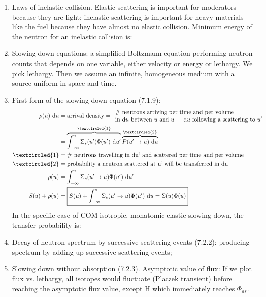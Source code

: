 \documentclass{school-22.211-notes}
\begin{document}
\begin{enumerate}
\item Laws of inelastic collision. Elastic scattering is important for moderators because they are light; inelastic scattering is important for heavy materials like the fuel because they have almost no elastic collision. Minimum energy of the neutron for an inelastic collision is:

\item Slowing down equations: a simplified Boltzmann equation performing neutron counts that depends on one variable, either velocity or energy or lethargy. We pick lethargy. Then we assume an infinite, homogeneous medium with a source uniform in space and time. 

\item First form of the slowing down equation (7.1.9):
  \begin{align}
    \rho(u) \du 
    &= \mbox{arrival density} = \begin{array}{l}
      \mbox{\# neutrons arriving per time and per volume} \\
      \mbox{in d$u$ between $u$ and $u + \du$ following a scattering to $u'$} 
      \end{array} \\
    &= \overbrace{\int_{-\infty}^u \Sigma_s (u') \Phi(u') \du'}^{\textcircled{1}} \overbrace{ P(u'\to u) \du }^{\textcircled{2}} \\
    \textcircled{1} &= \mbox{\# neutrons travelling in du' and scattered per time and per volume} \\
    \textcircled{2} &= \mbox{probability a neutron scattered at u' will be transferred in du} \\
    \rho(u) &= \int_{-\infty}^u \Sigma_s (u'\to u) \Phi(u') \du' \\
    S(u) + \rho(u) &= \boxed{S(u) + \int_{-\infty}^u \Sigma_s (u'\to u) \Phi(u') \du  = \Sigma(u) \Phi(u) }
  \end{align}
  In the specific case of COM isotropic, monatomic elastic slowing down, the transfer probability is:
\item Decay of neutron spectrum by successive scattering events (7.2.2): producing spectrum by adding up successive scattering events;
\item Slowing down without absorption (7.2.3). Asymptotic value of flux: 
  If we plot flux vs. lethargy, all isotopes would fluctuate (Placzek transient) before reaching the asymptotic flux value, except H which immediately reaches $\Phi_{as}$. 

\end{enumerate}
\end{document}
